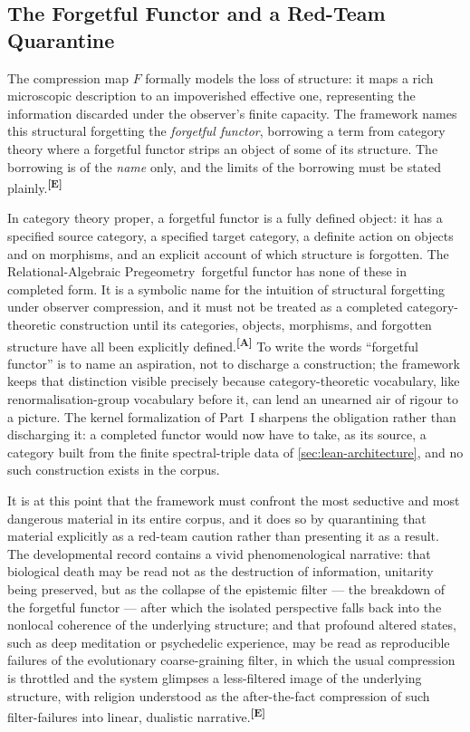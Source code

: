 \documentclass[12pt,a4paper,twoside]{article}
\theoremstyle{plain}
\theoremstyle{definition}
\theoremstyle{remark}
\newcommand{\ProjectShort}{Relational-Algebraic Pregeometry}
\newcommand{\RAP}{\ProjectShort}
\newcommand{\catmark}[1]{\textsuperscript{\textsf{\textbf{[#1]}}}}
\begin{document}
\subsection{The Forgetful Functor and a Red-Team Quarantine}
\label{subsec:forgetful-functor}

The compression map $F$ formally models the loss of structure: it maps a
rich microscopic description to an impoverished effective one,
representing the information discarded under the observer's finite
capacity. The framework names this structural forgetting the
\emph{forgetful functor}, borrowing a term from category theory where a
forgetful functor strips an object of some of its structure. The
borrowing is of the \emph{name} only, and the limits of the borrowing
must be stated plainly.\catmark{E}

In category theory proper, a forgetful functor is a fully defined
object: it has a specified source category, a specified target category,
a definite action on objects and on morphisms, and an explicit account
of which structure is forgotten. The \RAP\ forgetful functor has none
of these in completed form. It is a symbolic name for the intuition of
structural forgetting under observer compression, and it must not be
treated as a completed category-theoretic construction until its
categories, objects, morphisms, and forgotten structure have all been
explicitly defined.\catmark{A} To write the words ``forgetful functor''
is to name an aspiration, not to discharge a construction; the framework
keeps that distinction visible precisely because category-theoretic
vocabulary, like renormalisation-group vocabulary before it, can lend an
unearned air of rigour to a picture. The kernel formalization of Part~I
sharpens the obligation rather than discharging it: a completed functor
would now have to take, as its source, a category built from the finite
spectral-triple data of \cref{sec:lean-architecture}, and no such
construction exists in the corpus.

It is at this point that the framework must confront the most seductive
and most dangerous material in its entire corpus, and it does so by
quarantining that material explicitly as a red-team caution rather than
presenting it as a result. The developmental record contains a vivid
phenomenological narrative: that biological death may be read not as the
destruction of information, unitarity being preserved, but as the
collapse of the epistemic filter --- the breakdown of the forgetful
functor --- after which the isolated perspective falls back into the
nonlocal coherence of the underlying structure; and that profound
altered states, such as deep meditation or psychedelic experience, may
be read as reproducible failures of the evolutionary coarse-graining
filter, in which the usual compression is throttled and the system
glimpses a less-filtered image of the underlying structure, with
religion understood as the after-the-fact compression of such
filter-failures into linear, dualistic narrative.\catmark{E}
\end{document}
